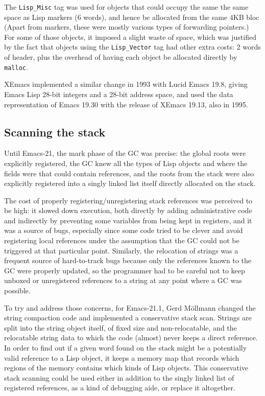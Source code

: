 \documentclass[format=acmsmall, review]{acmart}
\newcommand \Elisp {Emacs Lisp}
\begin{document}
The \texttt{Lisp\_Misc} tag was used for objects that could occupy the same
the same space as Lisp markers (6 words), and hence be allocated from the same
4KB bloc  (Apart from markers, these were mostly various types of
forwarding pointers.)  For some of those objects, it imposed a slight waste of space,
which was justified by the fact that objects using the \texttt{Lisp\_Vector}
tag had other extra costs: 2 words of header, plus the overhead of having
each object be allocated directly by \texttt{malloc}.

XEmacs implemented a similar change in 1993 with Lucid Emacs 19.8,
giving \Elisp{} 28-bit integers and a 28-bit address space, and
used the data representation of Emacs 19.30 with the release of XEmacs 19.13, also in
1995.


\subsection{Scanning the stack}
\label{sec:stack-scanning}

Until Emacs-21, the mark phase of the GC was precise: the global roots were
explicitly registered, the GC knew all the types of Lisp objects and where
the fields were that could contain references, and the roots from the stack
were also explicitly registered into a singly linked list itself directly
allocated on the stack.

The cost of properly registering/unregistering stack references was
perceived to be high: it slowed down execution, both directly by adding
administrative code and indirectly by preventing some variables from being
kept in registers, and it was a source of bugs, especially since some code
tried to be clever and avoid registering local references under the
assumption that the GC could not be triggered at that particular point.
Similarly, the relocation of strings was a frequent source of hard-to-track
bugs because only the references known to the GC were properly updated, so
the programmer had to be careful not to keep unboxed or unregistered
references to a string at any point where a GC was possible.

To try and address those concerns, for Emacs-21.1, Gerd Möllmann changed the
string compaction code and implemented a conservative stack scan.
Strings are split into the string object itself, of fixed size and
non-relocatable, and the relocatable string data to which the code (almost)
never keeps a direct reference.  In order to find out if a given word found
on the stack might be a potentially valid reference to a Lisp object, it
keeps a memory map that records which regions of the memory contains which
kinds of Lisp objects.  This conservative stack scanning could be used
either in addition to the singly linked list of registered references, as
a kind of debugging aide, or replace it altogether.
\end{document}
